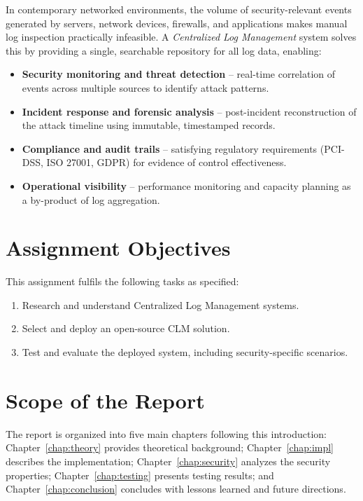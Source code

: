 \documentclass[12pt,a4paper]{report}
\begin{document}
In contemporary networked environments, the volume of security-relevant events generated by
servers, network devices, firewalls, and applications makes manual log inspection practically
infeasible.
A \textit{Centralized Log Management} system solves this by providing a single, searchable
repository for all log data, enabling:

\begin{itemize}[leftmargin=1.5em]
    \item \textbf{Security monitoring and threat detection} -- real-time correlation of events
          across multiple sources to identify attack patterns.
    \item \textbf{Incident response and forensic analysis} -- post-incident reconstruction of the
          attack timeline using immutable, timestamped records.
    \item \textbf{Compliance and audit trails} -- satisfying regulatory requirements
          (PCI-DSS, ISO 27001, GDPR) for evidence of control effectiveness.
    \item \textbf{Operational visibility} -- performance monitoring and capacity planning as a
          by-product of log aggregation.
\end{itemize}

\section{Assignment Objectives}

This assignment fulfils the following tasks as specified:
\begin{enumerate}[leftmargin=1.5em]
    \item Research and understand Centralized Log Management systems.
    \item Select and deploy an open-source CLM solution.
    \item Test and evaluate the deployed system, including security-specific scenarios.
\end{enumerate}

\section{Scope of the Report}

The report is organized into five main chapters following this introduction:
Chapter~\ref{chap:theory} provides theoretical background; Chapter~\ref{chap:impl} describes
the implementation; Chapter~\ref{chap:security} analyzes the security properties;
Chapter~\ref{chap:testing} presents testing results; and Chapter~\ref{chap:conclusion}
concludes with lessons learned and future directions.
\end{document}
